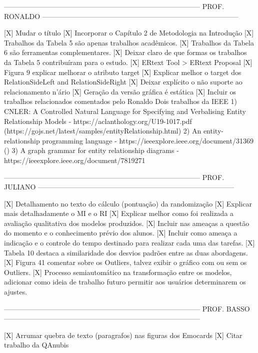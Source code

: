 ------------------------------------------------------------------------------------
PROF. RONALDO
------------------------------------------------------------------------------------

[X] Mudar o título
[X] Incorporar o Capítulo 2 de Metodologia na Introdução
[X] Trabalhos da Tabela 5 são apenas trabalhos acadêmicos.
[X] Trabalhos da Tabela 6 são ferramentas complementares.
[X] Deixar claro de que formas os trabalhos da Tabela 5 contribuíram para o estudo.
[X] ERtext Tool > ERtext Proposal
[X] Figura 9 explicar melhorar o atributo target
[X] Explicar melhor o target dos RelationSideLeft and RelationSideRight
[X] Deixar explícito o não suporte ao relacionamento n'ário
[X] Geração da versão gráfica é estática
[X] Incluir os trabalhos relacionados comentados pelo Ronaldo
	Dois trabalhos da IEEE
	1) CNLER: A Controlled Natural Language for Specifying and Verbalising Entity Relationship Models - https://aclanthology.org/U19-1017.pdf 
			(https://gojs.net/latest/samples/entityRelationship.html)
	2) An entity-relationship programming language - https://ieeexplore.ieee.org/document/31369 ()
	3) A graph grammar for entity relationship diagrams - https://ieeexplore.ieee.org/document/7819271

------------------------------------------------------------------------------------
PROF. JULIANO
------------------------------------------------------------------------------------

[X] Detalhamento no texto do cálculo (pontuação) da randomização
[X] Explicar mais detalhadamente o MI e o RI
[X] Explicar melhor como foi realizada a avaliação qualitativa dos modelos produzidos.
[X] Incluir nas ameaças a questão do momento e o conhecimento prévio dos alunos.
[X] Incluir como ameaça a indicação e o controle do tempo destinado para realizar cada uma das tarefas.
[X] Tabela 10 destaca a similaridade dos desvios padrões entre as duas abordagens.
[X] Figura 41 comentar sobre os Outliers, talvez exibir o gráfico com ou sem os Outliers.
[X] Processo semiautomático na transformação entre os modelos, adicionar como ideia de trabalho futuro permitir aos usuários determinarem os ajustes.

------------------------------------------------------------------------------------
PROF. BASSO
------------------------------------------------------------------------------------

[X] Arrumar quebra de texto (paragrafos) nas figuras dos Emocards
[X] Citar trabalho da QAnubis 


